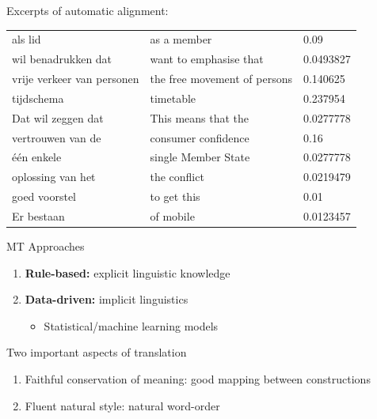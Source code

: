 \documentclass[compress]{beamer}
\begin{document}
\begin{frame}[fragile]
	Excerpts of automatic alignment:

	\footnotesize{
	\begin{tabular}{l|l|l}
	\hline
	als lid	& as a member &	0.09 \\
	wil benadrukken dat	& want to emphasise that &	0.0493827 \\
	vrije verkeer van personen	& the free movement of persons &	0.140625	 \\
	tijdschema &	timetable &	0.237954 \\
  	Dat wil zeggen dat & This means that the & 0.0277778 \\
	\hline
	vertrouwen van de &	consumer confidence & 0.16	 \\
	\'e\'en enkele & single Member State & 0.0277778 \\
	oplossing van het &	the conflict &0.0219479 \\
	\hline
	goed voorstel &	to get this	& 0.01 \\
	Er bestaan &	of mobile &	0.0123457 \\
	\end{tabular}
	}
\end{frame}





\begin{frame}
	\begin{block}{MT Approaches}
		\begin{enumerate}
			\item \textbf{Rule-based:} explicit linguistic knowledge
			\item \textbf{Data-driven:} implicit linguistics	
			\begin{itemize}
				\item Statistical/machine learning models
			\end{itemize}						
		\end{enumerate}
	\end{block}

	\begin{block}{Two important aspects of translation}
		\begin{enumerate}
			\item Faithful conservation of meaning: good mapping between constructions
			\item Fluent natural style: natural word-order
		\end{enumerate}
	\end{block}
\end{frame}
\end{document}
